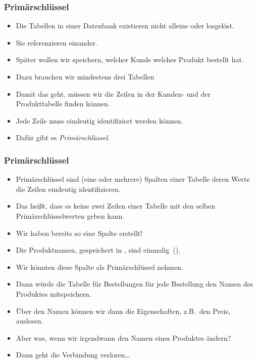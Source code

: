 \documentclass[aspectratio=169,mathserif,notheorems]{beamer}%
\begin{document}
%
%
\begin{frame}[t]%
\frametitle{Primärschlüssel}%
\begin{itemize}%
\item Die Tabellen in einer Datenbank existieren nicht alleine oder losgelöst.%
\item<2-> Sie referenzieren einander.%
\item<3-> Später wollen wir speichern, welcher Kunde welches Produkt bestellt hat.%
\item<4-> Dazu brauchen wir mindestens drei Tabellen%
\item<8-> Damit das geht, müssen wir die Zeilen in der Kunden- und der Produkttabelle finden können.%
\item<9-> Jede Zeile muss eindeutig identifiziert werden können.%
\item<10-> Dafür gibt es \emph{Primärschlüssel}.%
\end{itemize}%
\end{frame}%
%
%
\begin{frame}[t]%
\frametitle{Primärschlüssel}%
\begin{itemize}%
\item Primärschlüssel sind (eine oder mehrere) Spalten einer Tabelle deren Werte die Zeilen eindeutig identifizieren.%
\item<2-> Das heißt, dass es keine zwei Zeilen einer Tabelle mit den selben Primärschlüsselwerten geben kann.%
\item<3-> Wir haben bereits so eine Spalte erstellt!%
\item<4-> Die Produktnamen, gespeichert in , sind einmalig~().%
\item<5-> Wir könnten diese Spalte als Primärschlüssel nehmen.%
\item<6-> Dann würde die Tabelle für Bestellungen für jede Bestellung den Namen des Produktes mitspeichern.%
\item<7-> Über den Namen können wir dann die Eigenschaften, z.B.\ den Preis, auslesen.%
\item<8-> Aber was, wenn wir irgendwann den Namen eines Produktes ändern?%
\item<9-> Dann geht die Verbindung verloren\dots%
\end{itemize}%
\end{frame}%
\end{document}
